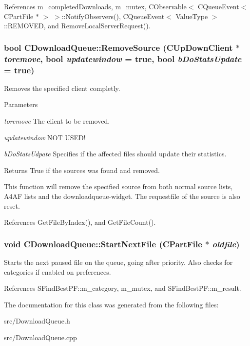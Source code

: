References m\_\-completedDownloads, m\_\-mutex, CObservable$<$ CQueueEvent$<$ CPartFile $\ast$ $>$ $>$::NotifyObservers(), CQueueEvent$<$ ValueType $>$::REMOVED, and RemoveLocalServerRequest().
\subsubsection[{RemoveSource}]{\setlength{\rightskip}{0pt plus 5cm}bool CDownloadQueue::RemoveSource ({\bf CUpDownClient} $\ast$ {\em toremove}, \/  bool {\em updatewindow} = {\ttfamily true}, \/  bool {\em bDoStatsUpdate} = {\ttfamily true})}\label{classCDownloadQueue_a4faa385ebab56cfadb5273365998b323}


Removes the specified client completly. 
\begin{DoxyParams}{Parameters}
\item[{\em toremove}]The client to be removed. \item[{\em updatewindow}]NOT USED! \item[{\em bDoStatsUdpate}]Specifies if the affected files should update their statistics. \end{DoxyParams}
\begin{DoxyReturn}{Returns}
True if the sources was found and removed.
\end{DoxyReturn}
This function will remove the specified source from both normal source lists, A4AF lists and the downloadqueue-\/widget. The requestfile of the source is also reset. 

References GetFileByIndex(), and GetFileCount().
\subsubsection[{StartNextFile}]{\setlength{\rightskip}{0pt plus 5cm}void CDownloadQueue::StartNextFile ({\bf CPartFile} $\ast$ {\em oldfile})}\label{classCDownloadQueue_a456551034265541eea0ceece9f526df4}


Starts the next paused file on the queue, going after priority. Also checks for categories if enabled on preferences. 

References SFindBestPF::m\_\-category, m\_\-mutex, and SFindBestPF::m\_\-result.

The documentation for this class was generated from the following files:\begin{DoxyCompactItemize}
\item 
src/DownloadQueue.h\item 
src/DownloadQueue.cpp\end{DoxyCompactItemize}
